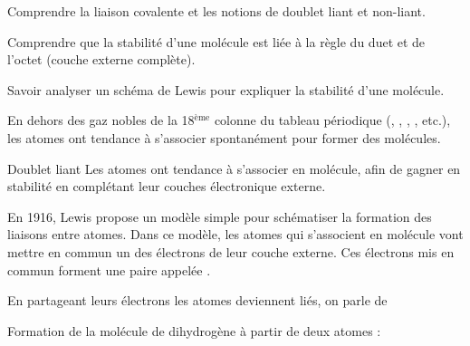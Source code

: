 \sndEnTeteTrois

\vspace*{-20pt}


\begin{objectifs}
  \item Comprendre la liaison covalente et les notions de doublet liant et non-liant.
  \item Comprendre que la stabilité d'une molécule est liée à la règle du duet et de l'octet (couche externe complète).
  \item Savoir analyser un schéma de Lewis pour expliquer la stabilité d'une molécule.
\end{objectifs}

\begin{contexte}
  En dehors des gaz nobles de la 18$^\text{ème}$ colonne du tableau périodique (, , , , etc.), les atomes ont tendance à s'associer spontanément pour former des molécules. 
  
\end{contexte}



\begin{doc}{Doublet liant}
  Les atomes ont tendance à s'associer en molécule, afin de gagner en stabilité en complétant leur couches électronique externe.
  
  En 1916, Lewis propose un modèle simple pour schématiser la formation des liaisons entre atomes.
  Dans ce modèle, les atomes qui s'associent en molécule vont mettre en commun un des électrons de leur couche externe.
  Ces électrons mis en commun forment une paire appelée \og {} \fg.
  
  En partageant leurs électrons les atomes deviennent liés, on parle de 
  
  \exemple Formation de la molécule de dihydrogène  à partir de deux atomes  :
  \vspace{8pt}
  
\end{doc}

